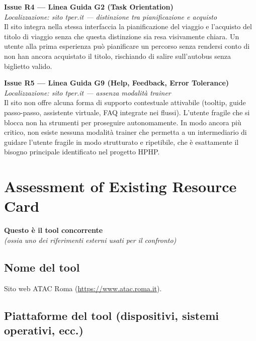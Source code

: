 \documentclass[11pt,a4paper]{article}
\begin{document}
\bigskip

\noindent\textbf{Issue R4 — Linea Guida G2 (Task Orientation)}\label{iss:R4}\\
\textit{Localizzazione: sito tper.it — distinzione tra pianificazione e acquisto}\\

\noindent Il sito integra nella stessa interfaccia la pianificazione del viaggio e l'acquisto del titolo di viaggio senza che questa distinzione sia resa visivamente chiara. Un utente alla prima esperienza può pianificare un percorso senza rendersi conto di non han ancora acquistato il titolo, rischiando di salire sull'autobus senza biglietto valido.

\bigskip

\noindent\textbf{Issue R5 — Linea Guida G9 (Help, Feedback, Error Tolerance)}\label{iss:R5}\\
\textit{Localizzazione: sito tper.it — assenza modalità trainer}\\

\noindent Il sito non offre alcuna forma di supporto contestuale attivabile (tooltip, guide passo-passo, assistente virtuale, FAQ integrate nei flussi). L'utente fragile che si blocca non ha strumenti per proseguire autonomamente. In modo ancora più critico, non esiste nessuna modalità trainer che permetta a un intermediario di guidare l'utente fragile in modo strutturato e ripetibile, che è esattamente il bisogno principale identificato nel progetto HPHP.

\newpage

\section*{Assessment of Existing Resource Card}

\textbf{Questo è il tool concorrente}\\
\textit{(ossia uno dei riferimenti esterni usati per il confronto)}

\subsection*{Nome del tool}

\noindent Sito web ATAC Roma (\url{https://www.atac.roma.it}).

\subsection*{Piattaforme del tool (dispositivi, sistemi operativi, ecc.)}
\end{document}
